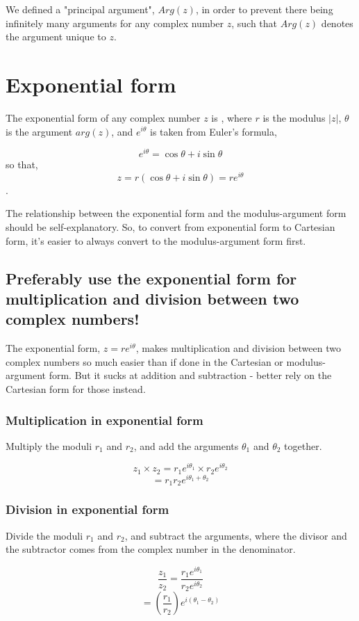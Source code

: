 \documentclass{article}
\begin{document}
\noindent We defined a "principal argument", $Arg(z)$, in order to prevent there being infinitely many arguments for any complex number $z$, such that $Arg(z)$ denotes the argument unique to $z$.

\section{Exponential form}
The exponential form of any complex number $z$ is , where $r$ is the modulus $|z|$, $\theta$ is the argument $arg(z)$, and $e^{i\theta}$ is taken from Euler's formula,
\vspace{-\baselineskip}
\begin{center}
$$e^{i\theta}=\cos\theta + i\sin\theta$$ 
so that,
$$z=r(\cos\theta+i\sin\theta)=re^{i\theta}$$.
\end{center}

\noindent The relationship between the exponential form and the modulus-argument form should be self-explanatory. So, to convert from exponential form to Cartesian form, it's easier to always convert to the modulus-argument form first.

\subsection{Preferably use the exponential form for multiplication and division between two complex numbers!}

The exponential form, $z=re^{i\theta}$, makes multiplication and division between two complex numbers so much easier than if done in the Cartesian or modulus-argument form. But it sucks at addition and subtraction - better rely on the Cartesian form for those instead.

\subsubsection{Multiplication in exponential form}
Multiply the moduli $r_1$ and $r_2$, and add the arguments $\theta_1$ and $\theta_2$ together.

$$z_1 \times z_2 = r_1e^{i\theta_1} \times r_2e^{i\theta_2}$$
$$=r_1r_2e^{i\theta_1+\theta_2}$$

\subsubsection{Division in exponential form}
Divide the moduli $r_1$ and $r_2$, and subtract the arguments, where the divisor and the subtractor comes from the complex number in the denominator.

$$\frac{z_1}{z_2}=\frac{r_1e^{i\theta_1}}{r_2e^{i\theta_2}}$$
$$=(\frac{r_1}{r_2})e^{i(\theta_1-\theta_2)}$$
\end{document}
